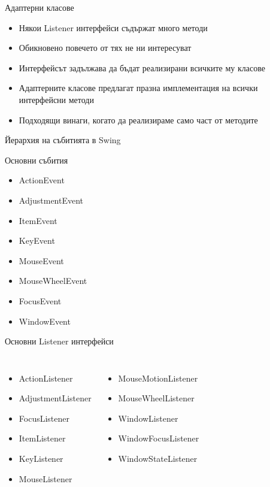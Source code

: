 \documentclass{beamer}
\begin{document}
\begin{frame}{Адаптерни класове}
  \transdissolve
  \begin{itemize}
  \item Някои Listener интерфейси съдържат много методи
  \item Обикновено повечето от тях не ни интересуват
  \item Интерфейсът задължава да бъдат реализирани всичките му класове
  \item Адаптерните класове предлагат празна имплементация на всички
    интерфейсни методи
  \item Подходящи винаги, когато да реализираме само част от методите
  \end{itemize}
\end{frame}


\begin{frame}{Йерархия на събитията в Swing}
  \transdissolve
  
\end{frame}

\begin{frame}{Основни събития}
  \transdissolve
  \begin{itemize}
  \item ActionEvent
  \item AdjustmentEvent
  \item ItemEvent
  \item KeyEvent
  \item MouseEvent
  \item MouseWheelEvent
  \item FocusEvent
  \item WindowEvent
  \end{itemize}
\end{frame}

\begin{frame}{Основни Listener интерфейси}
  \transdissolve
  \begin{columns}
    \begin{itemize}
      \item ActionListener
      \item AdjustmentListener
      \item FocusListener
      \item ItemListener
      \item KeyListener
      \item MouseListener
    \end{itemize}
    \begin{itemize}
      \item MouseMotionListener
      \item MouseWheelListener
      \item WindowListener
      \item WindowFocusListener
      \item WindowStateListener
    \end{itemize}

  \end{columns}
\end{frame}
\end{document}
